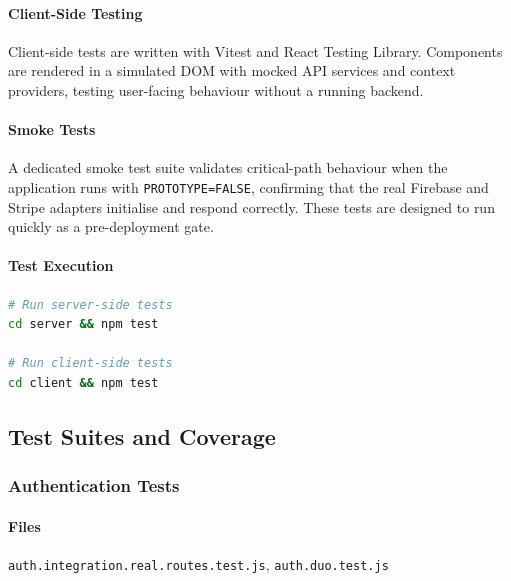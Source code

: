 \documentclass[11pt]{article}
\begin{document}
\paragraph{Client-Side Testing}
Client-side tests are written with Vitest and React Testing Library. Components are
rendered in a simulated DOM with mocked API services and context providers, testing
user-facing behaviour without a running backend.

\paragraph{Smoke Tests}
A dedicated smoke test suite validates critical-path behaviour when the application
runs with \texttt{PROTOTYPE=FALSE}, confirming that the real Firebase and Stripe
adapters initialise and respond correctly. These tests are designed to run quickly
as a pre-deployment gate.

\paragraph{Test Execution}
\begin{lstlisting}[language=bash]
# Run server-side tests
cd server && npm test

# Run client-side tests
cd client && npm test
\end{lstlisting}

\subsection{Test Suites and Coverage}

\subsubsection{Authentication Tests}

\paragraph{Files}
\texttt{auth.integration.real.routes.test.js}, \texttt{auth.duo.test.js}
\end{document}
